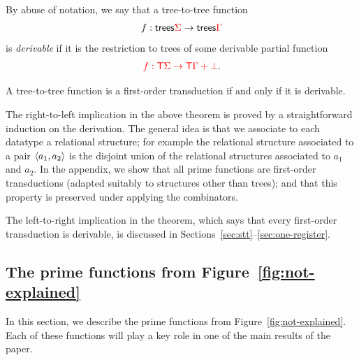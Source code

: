 
By abuse of notation, we say that a tree-to-tree function  
    \begin{align*}
        f : \mathsf {trees} {\color{red}{\Sigma}} \to \mathsf {trees} {\color{red}{\Gamma}}
    \end{align*}
    is \emph{derivable} if it is the restriction to trees of some derivable partial function
    \begin{align*}
        {\color{red}{f : {\color{red}{\mathsf T}}\Sigma \to {\color{red}{\mathsf T}}\Gamma + {\color{red}{\bot}}}}.
    \end{align*}

\begin{theorem}\label{thm:main} A tree-to-tree function is a first-order transduction if and only if it is derivable.
\end{theorem}


The right-to-left implication in the above theorem is proved by a straightforward induction on the derivation. The general idea is that we associate to each datatype a relational structure; for example the relational structure associated to a pair $\langle{a_1,a_2}\rangle$ is the disjoint union of the relational structures associated to $a_1$ and $a_2$.  In the appendix, we show that all prime functions are first-order transductions (adapted suitably to structures other than trees); and that this property is preserved under applying the combinators.  

The  left-to-right implication in the theorem, which says that every first-order transduction is derivable, is discussed in Sections~\ref{sec:stt}--\ref{sec:one-register}.


%
\subsection{The prime functions from Figure~\ref{fig:not-explained}}
\label{sec:prime-and-combinators}
In this section, we  describe the prime functions from Figure~\ref{fig:not-explained}. 
Each of these functions will play a key role in one of the main results of the paper.


